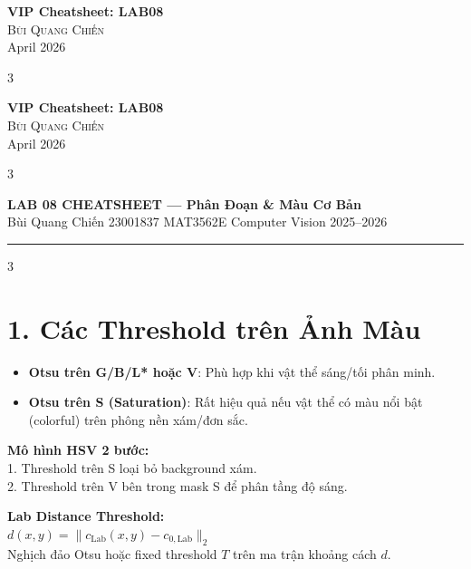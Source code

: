 \documentclass[9pt,landscape,a4paper]{extarticle}
\begin{document}
\begin{center}
    {\Large \bfseries VIP Cheatsheet: LAB08} \\
    \vspace{0.3cm}
    {\large \textsc{Bùi Quang Chiến}} \\
    \vspace{0.2cm}
    {\small April 2026}
\end{center}
\vspace{0.3cm}

\begin{multicols*}{3}

\begin{center}
    {\Large \bfseries VIP Cheatsheet: LAB08} \\
    \vspace{0.3cm}
    {\large \textsc{Bùi Quang Chiến}} \\
    \vspace{0.2cm}
    {\small April 2026}
\end{center}
\vspace{0.3cm}

\begin{multicols*}{3}

\begin{center}
  {\large\bfseries\color{hdr} LAB 08 CHEATSHEET --- Phân Đoạn \& Màu Cơ Bản} \\[1pt]
  {\small Bùi Quang Chiến \textbullet{} 23001837 \textbullet{} MAT3562E Computer Vision 2025--2026}
\end{center}
\hrule\vspace{2pt}

\begin{multicols}{3}

\section{1. Các Threshold trên Ảnh Màu}
\begin{itemize}
    \item \textbf{Otsu trên G/B/L* hoặc V}: Phù hợp khi vật thể sáng/tối phân minh.
    \item \textbf{Otsu trên S (Saturation)}: Rất hiệu quả nếu vật thể có màu nổi bật (colorful) trên phông nền xám/đơn sắc.
\end{itemize}
\begin{tipbox}
\textbf{Mô hình HSV 2 bước:}\\
1. Threshold trên S loại bỏ background xám.\\
2. Threshold trên V bên trong mask S để phân tầng độ sáng.
\end{tipbox}
\begin{tipbox}
\textbf{Lab Distance Threshold:}\\
$d(x,y) = \|c_{\mathrm{Lab}}(x,y) - c_{0,\mathrm{Lab}}\|_2$\\
Nghịch đảo Otsu hoặc fixed threshold $T$ trên ma trận khoảng cách $d$.
\end{tipbox}


\end{multicols}
\end{multicols*}
\end{multicols*}
\end{document}
